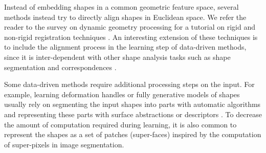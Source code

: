 
Instead of embedding shapes in a common geometric feature space, several methods instead try to directly align shapes in Euclidean space. We refer the reader to the survey on dynamic geometry processing for a tutorial on rigid and non-rigid registration techniques \cite{Chang:DGP:2012}. An interesting extension of these techniques is to include the alignment process in the learning step of data-driven methods, since it is inter-dependent with other shape analysis tasks such as shape segmentation and correspondences \cite{Kim:2013:lpt}.

Some data-driven methods require additional processing steps on the input. For example, learning deformation handles or fully generative models of shapes usually rely on segmenting the input shapes into parts with automatic algorithms \cite{Huang:2011:JSS,Sidi:2011:CS} and representing these parts with surface abstractions \cite{Yumer:2012:CSC} or descriptors \cite{Kalogerakis:2012:PMC}. To decrease the amount of computation required during learning, it is also common to represent the shapes as a set of patches (super-faces) \cite{Huang:2011:JSS} inspired by the computation of super-pixels in image segmentation.

